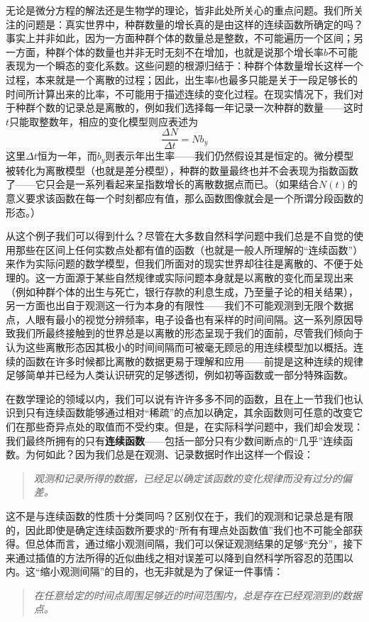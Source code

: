 \documentclass[12pt,a4paper]{article}
\begin{document}
{{			无论是微分方程的解法还是生物学的理论，皆非此处所关心的重点问题。我们所关注的问题是：真实世界中，种群数量的增长真的是由这样的连续函数所确定的吗？事实上并非如此，因为一方面种群个体的数量总是整数，不可能遍历一个区间；另一方面，种群个体的数量也并非无时无刻不在增加，也就是说那个增长率$b$不可能表现为一个瞬态的变化系数。这些问题的根源归结于：种群个体数量增长这样一个过程，本来就是一个离散的过程；因此，出生率$b$也最多只能是关于一段足够长的时间所计算出来的比率，不可能用于描述连续的变化过程。在现实情况下，我们对于种群个数的记录总是离散的，例如我们选择每一年记录一次种群的数量——这时$t$只能取整数年，相应的变化模型则应表述为
			\[
				\frac{\Delta N}{\Delta t}=Nb_y
			\]
			这里$\Delta t$恒为一年，而$b_y$则表示年出生率——我们仍然假设其是恒定的。微分模型被转化为离散模型（也就是差分模型），种群的数量最终也并不会表现为指数函数了——它只会是一系列看起来呈指数增长的离散数据点而已。（如果结合$N(t)$的意义要求该函数在每一个时刻都应有值，那么函数图像就会是一个所谓分段函数的形态。）
			
			从这个例子我们可以得到什么？尽管在大多数自然科学问题中我们总是不自觉的使用那些在区间上任何实数点处都有值的函数（也就是一般人所理解的“连续函数”）来作为实际问题的数学模型，但我们所面对的现实世界却往往是离散的、不便于处理的。这一方面源于某些自然规律或实际问题本身就是以离散的变化而呈现出来（例如种群个体的出生与死亡，银行存款的利息生成，乃至量子论的相关结果），另一方面也出自于观测这一行为本身的有限性——我们不可能观测到无限个数据点，人眼有最小的视觉分辨频率，电子设备也有采样的时间间隔。这一系列原因导致我们所最终接触到的世界总是以离散的形态呈现于我们的面前，尽管我们倾向于认为这些离散形态因其极小的时间间隔而可被毫无顾忌的用连续模型加以概括。连续的函数在许多时候都比离散的数据更易于理解和应用——前提是这种连续的规律足够简单并已经为人类认识研究的足够透彻，例如初等函数或一部分特殊函数。
			
			在数学理论的领域以内，我们可以说有许许多多不同的函数，且在上一节我们也认识到只有连续函数能够通过相对“稀疏”的点加以确定，其余函数则可任意的改变它们在那些奇异点处的取值而不受约束。但是，在实际科学问题中，我们却会发现：我们最终所拥有的只有{\bfseries 连续函数}——包括一部分只有少数间断点的“几乎”连续函数。为何如此？因为我们总是在观测、记录数据时作出这样一个假设：
			\begin{quote}\itshape
				观测和记录所得的数据，已经足以确定该函数的变化规律而没有过分的偏差。
			\end{quote}
		
			这不是与连续函数的性质十分类同吗？区别仅在于，我们的观测和记录总是有限的，因此即使是确定连续函数所要求的“所有有理点处函数值”我们也不可能全部获得。但总体而言，通过缩小观测间隔，我们可以保证观测结果的足够“充分”，接下来通过插值的方法所得的近似曲线之相对误差可以降到自然科学所容忍的范围以内。这“缩小观测间隔”的目的，也无非就是为了保证一件事情：
			\begin{quote}\itshape
				在任意给定的时间点周围足够近的时间范围内，总是存在已经观测到的数据点。
			\end{quote}
		
}}
\end{document}
